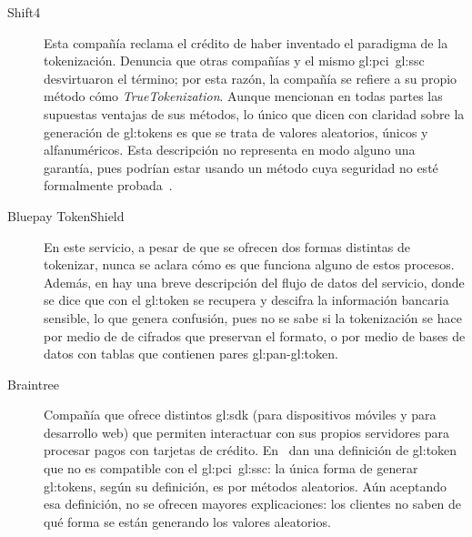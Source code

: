 \begin{description}

  \item[Shift4]
    Esta compañía reclama el crédito de haber inventado el paradigma de
    la tokenización. Denuncia que otras compañías y el mismo
    \gls{gl:pci}~\gls{gl:ssc} desvirtuaron el término; por esta razón, la
    compañía se refiere a su propio método cómo \textit{TrueTokenization}.
    Aunque mencionan en todas partes las supuestas ventajas de sus métodos,
    lo único que dicen con claridad sobre la generación de \glspl{gl:token} es
    que se trata de valores aleatorios, únicos y alfanuméricos. Esta descripción
    no representa en modo alguno una garantía, pues podrían estar usando un
    método cuya seguridad no esté formalmente
    probada~\cite{shif4_uno, shif4_dos}.

  \item[Bluepay TokenShield]
    En este servicio, a pesar de que se ofrecen dos formas distintas de
    tokenizar, nunca se aclara cómo es que funciona alguno de estos procesos.
    Además, en \cite{bluepay_tokenshield} hay una breve descripción del flujo
    de datos del servicio, donde se dice que con el \gls{gl:token} se recupera
    y descifra la información bancaria sensible, lo que genera confusión, pues
    no se sabe si la tokenización se hace por medio de de cifrados que
    preservan el formato\footnotemark, o por medio de bases de datos con tablas
    que contienen pares \gls{gl:pan}-\gls{gl:token}.


  \item[Braintree]
    Compañía que ofrece distintos \gls{gl:sdk} (para dispositivos móviles y
    para desarrollo web) que permiten interactuar con sus propios servidores
    para procesar pagos con tarjetas de crédito. En~\cite{braintree_uno}
    dan una definición de \gls{gl:token} que no es compatible con el
    \gls{gl:pci}~\gls{gl:ssc}: la única forma de generar \glspl{gl:token},
    según su definición, es por métodos aleatorios. Aún aceptando
    esa definición, no se ofrecen mayores explicaciones: los clientes no
    saben de qué forma se están generando los valores aleatorios.


\end{description}
